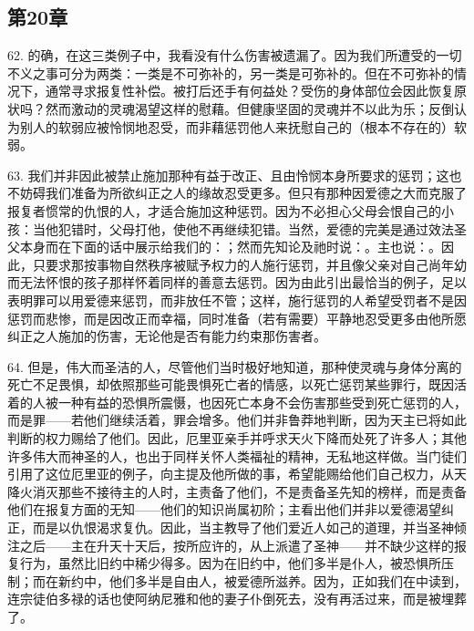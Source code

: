 
\subsection{第20章}

62. 的确，在这三类例子中，我看没有什么伤害被遗漏了。因为我们所遭受的一切不义之事可分为两类：一类是不可弥补的，另一类是可弥补的。但在不可弥补的情况下，通常寻求报复性补偿。被打后还手有何益处？受伤的身体部位会因此恢复原状吗？然而激动的灵魂渴望这样的慰藉。但健康坚固的灵魂并不以此为乐；反倒认为别人的软弱应被怜悯地忍受，而非藉惩罚他人来抚慰自己的（根本不存在的）软弱。\par

63. 我们并非因此被禁止施加那种有益于改正、且由怜悯本身所要求的惩罚；这也不妨碍我们准备为所欲纠正之人的缘故忍受更多。但只有那种因爱德之大而克服了报复者惯常的仇恨的人，才适合施加这种惩罚。因为不必担心父母会恨自己的小孩：当他犯错时，父母打他，使他不再继续犯错。当然，爱德的完美是通过效法圣父本身而在下面的话中展示给我们的：；然而先知论及祂时说：。主也说：。因此，只要求那按事物自然秩序被赋予权力的人施行惩罚，并且像父亲对自己尚年幼而无法怀恨的孩子那样怀着同样的善意去惩罚。因为由此引出最恰当的例子，足以表明罪可以用爱德来惩罚，而非放任不管；这样，施行惩罚的人希望受罚者不是因惩罚而悲惨，而是因改正而幸福，同时准备（若有需要）平静地忍受更多由他所愿纠正之人施加的伤害，无论他是否有能力约束那伤害者。\par

64. 但是，伟大而圣洁的人，尽管他们当时极好地知道，那种使灵魂与身体分离的死亡不足畏惧，却依照那些可能畏惧死亡者的情感，以死亡惩罚某些罪行，既因活着的人被一种有益的恐惧所震慑，也因死亡本身不会伤害那些受到死亡惩罚的人，而是罪——若他们继续活着，罪会增多。他们并非鲁莽地判断，因为天主已将如此判断的权力赐给了他们。因此，厄里亚亲手并呼求天火下降而处死了许多人；其他许多伟大而神圣的人，也出于同样关怀人类福祉的精神，无私地这样做。当门徒们引用了这位厄里亚的例子，向主提及他所做的事，希望能赐给他们自己权力，从天降火消灭那些不接待主的人时，主责备了他们，不是责备圣先知的榜样，而是责备他们在报复方面的无知——他们的知识尚属初阶；主看出他们并非以爱德渴望纠正，而是以仇恨渴求复仇。因此，当主教导了他们爱近人如己的道理，并当圣神倾注之后——主在升天十天后，按所应许的，从上派遣了圣神——并不缺少这样的报复行为，虽然比旧约中稀少得多。因为在旧约中，他们多半是仆人，被恐惧所压制；而在新约中，他们多半是自由人，被爱德所滋养。因为，正如我们在中读到，连宗徒伯多禄的话也使阿纳尼雅和他的妻子仆倒死去，没有再活过来，而是被埋葬了。\par

